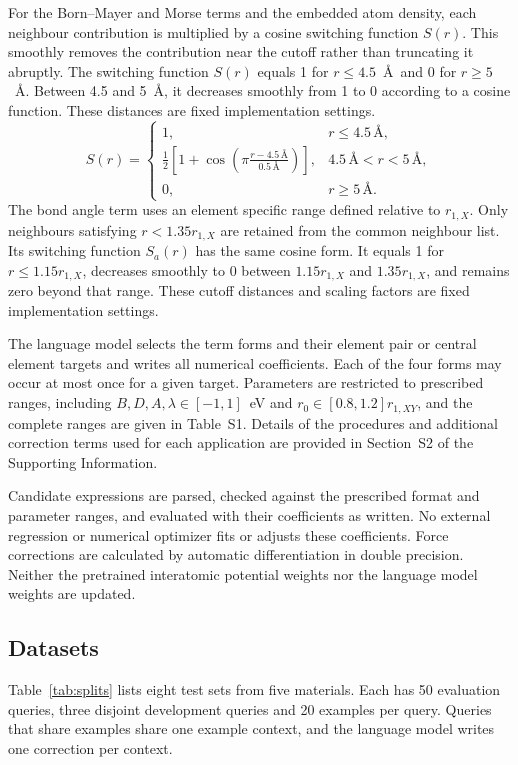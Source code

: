  For the Born--Mayer and Morse terms and the embedded atom density, each neighbour contribution is multiplied by a cosine switching function $S(r)$. This smoothly removes the contribution near the cutoff rather than truncating it abruptly.\cite{tersoff1989multicomponent,behler2007hdnn} The switching function $S(r)$ equals 1 for $r\le4.5$~\AA\ and 0 for $r\ge5$~\AA. Between 4.5 and 5~\AA, it decreases smoothly from 1 to 0 according to a cosine function. These distances are fixed implementation settings.
\[
S(r)=\begin{cases}1, & r\le4.5\,\text{\AA},\\[2pt]\frac12\!\left[1+\cos\!\left(\pi\frac{r-4.5\,\text{\AA}}{0.5\,\text{\AA}}\right)\right], & 4.5\,\text{\AA}<r<5\,\text{\AA},\\[2pt]0, & r\ge5\,\text{\AA}.\end{cases}
\]
The bond angle term uses an element specific range defined relative to $r_{1,X}$. Only neighbours satisfying $r<1.35r_{1,X}$ are retained from the common neighbour list. Its switching function $S_a(r)$ has the same cosine form. It equals 1 for $r\le1.15r_{1,X}$, decreases smoothly to 0 between $1.15r_{1,X}$ and $1.35r_{1,X}$, and remains zero beyond that range. These cutoff distances and scaling factors are fixed implementation settings.

The language model selects the term forms and their element pair or central element targets and writes all numerical coefficients. Each of the four forms may occur at most once for a given target. Parameters are restricted to prescribed ranges, including $B,D,A,\lambda\in[-1,1]$~eV and $r_0\in[0.8,1.2]r_{1,XY}$, and the complete ranges are given in Table~S1. Details of the procedures and additional correction terms used for each application are provided in Section~S2 of the Supporting Information.

Candidate expressions are parsed, checked against the prescribed format and parameter ranges, and evaluated with their coefficients as written. No external regression or numerical optimizer fits or adjusts these coefficients. Force corrections are calculated by automatic differentiation in double precision. Neither the pretrained interatomic potential weights nor the language model weights are updated.

\ifbulk
\subsection{Datasets}

Table~\ref{tab:splits} lists eight test sets from five materials. Each has 50 evaluation queries, three disjoint development queries and 20 examples per query. Queries that share examples share one example context, and the language model writes one correction per context.

